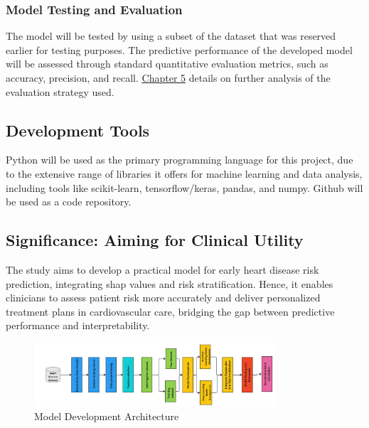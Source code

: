 \subsubsection{Model Testing and Evaluation} The model will be tested by using a subset of the dataset that was reserved earlier for testing purposes. The predictive performance of the developed model will be assessed through standard quantitative evaluation metrics, such as accuracy, precision, and recall. \hyperref[sec:eval]{Chapter 5} details on further analysis of the evaluation strategy used. 

\subsection{Development Tools} Python will be used as the primary programming language for this project, due to the extensive range of libraries it offers for machine learning and data analysis, including tools like scikit-learn, tensorflow/keras, pandas, and numpy.  Github will be used as a code repository.

\subsection{Significance: Aiming for Clinical Utility}
The study aims to develop a practical model for early heart disease risk prediction, integrating \gls{shap} values and risk stratification. Hence, it enables clinicians to assess patient risk more accurately and deliver personalized treatment plans in cardiovascular care,  bridging the gap between predictive
performance and interpretability.
\begin{figure}[h!]
    \centering
    \includegraphics[width=0.8\textwidth]{text/main_body/images/Flowchart.jpg} 
    \caption{Model Development Architecture}
    \label{fig:image_label}
\end{figure}
